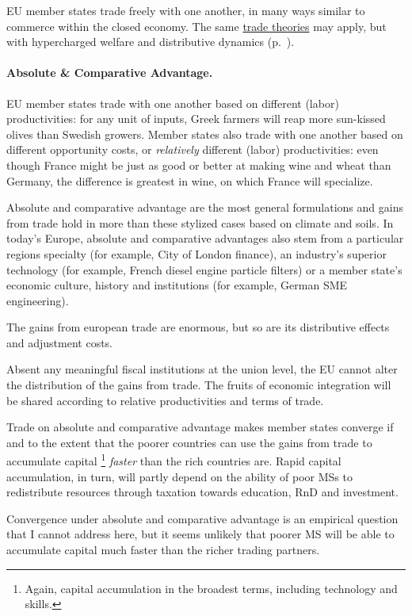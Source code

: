 \gls{EU} member states trade freely with one another, in many ways similar to commerce within the closed economy.
The same \hyperref[sec:space]{trade theories} may apply, but with hypercharged welfare and distributive dynamics (p.~\pageref{sec:space}).

\paragraph{Absolute \& Comparative Advantage.}
\gls{EU} member states trade with one another based on different (labor) productivities:
for any unit of inputs, Greek farmers will reap more sun-kissed olives than Swedish growers.
Member states also trade with one another based on different opportunity costs, or \emph{relatively} different (labor) productivities:
even though France might be just as good or better at making wine and wheat than Germany, the difference is greatest in wine, on which France will specialize.

Absolute and comparative advantage are the most general formulations and gains from trade hold in more than these stylized cases based on climate and soils.
In today's Europe, absolute and comparative advantages also stem from a particular regions specialty (for example, City of London finance), an industry's superior technology (for example, French diesel engine particle filters) or a member state's economic culture, history and institutions (for example, German \gls{SME} engineering).

The gains from european trade are enormous, but so are its distributive effects and adjustment costs.

Absent any meaningful fiscal institutions at the union level, the \gls{EU} cannot alter the distribution of the gains from trade.
The fruits of economic integration will be shared according to relative productivities and terms of trade.

Trade on absolute and comparative advantage makes member states converge if and to the extent that the poorer countries can use the gains from trade to accumulate capital
\footnote{
	Again, capital accumulation in the broadest terms, including technology and skills.
}
\emph{faster} than the rich countries are.
Rapid capital accumulation, in turn, will partly depend on the ability of poor \glspl{MS} to redistribute resources through taxation towards education, \gls{RnD} and investment.

Convergence under absolute and comparative advantage is an empirical question that I cannot address here, but it seems unlikely that poorer \gls{MS} will be able to accumulate capital much faster than the richer trading partners.

